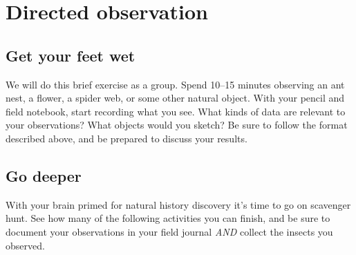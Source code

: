 \documentclass[letterpaper, 11pt]{article}
\begin{document}
\section*{Directed observation}

\subsection*{Get your feet wet}
We will do this brief exercise as a group. Spend 10--15 minutes observing an ant nest, a flower, a spider web, or some other natural object. With your pencil and field notebook, start recording what you see. What kinds of data are relevant to your observations? What objects would you sketch? Be sure to follow the format described above, and be prepared to discuss your results.

\subsection*{Go deeper}
With your brain primed for natural history discovery it's time to go on scavenger hunt. See how many of the following activities you can finish, and be sure to document your observations in your field journal \textit{AND} collect the insects you observed.
\end{document}
